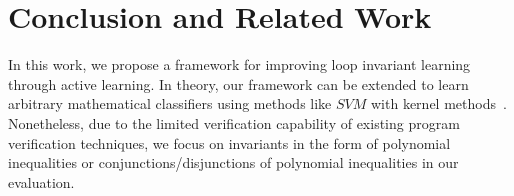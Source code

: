 
\section{Conclusion and Related Work} %
\label{sec:related}
In this work, we propose a framework for improving loop invariant learning through active learning. 
In theory, our framework can be extended to learn arbitrary mathematical classifiers using methods like $\mathit{SVM}$ with kernel methods~\cite{svm:kernel}. 
Nonetheless, due to the limited verification capability of existing program verification techniques, 
we focus on invariants in the form of polynomial inequalities or conjunctions/disjunctions of polynomial inequalities in our evaluation.



